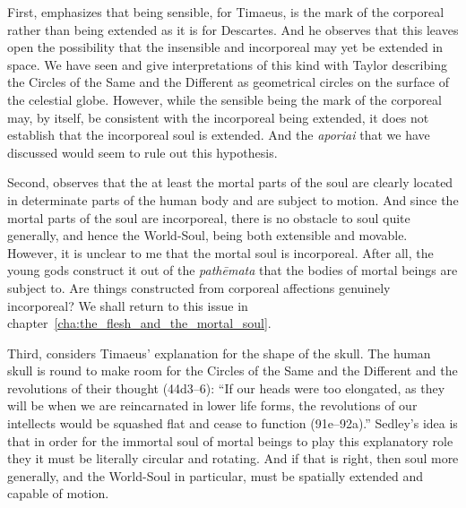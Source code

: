 First, \citet[329--30]{Sedley:1997kr} emphasizes that being sensible, for Timaeus, is the mark of the corporeal rather than being extended as it is for Descartes. And he observes that this leaves open the possibility that the insensible and incorporeal may yet be extended in space. We have seen \citet[111--2 n7]{Archer-Hind:1888qd} and \citet[148]{Taylor:1928qb} give interpretations of this kind with Taylor describing the Circles of the Same and the Different as geometrical circles on the surface of the celestial globe. However, while the sensible being the mark of the corporeal may, by itself, be consistent with the incorporeal being extended, it does not establish that the incorporeal soul is extended. And the \emph{aporiai} that we have discussed would seem to rule out this hypothesis.

Second, \citet[330]{Sedley:1997kr} observes that the at least the mortal parts of the soul are clearly located in determinate parts of the human body and are subject to motion. And since the mortal parts of the soul are incorporeal, there is no obstacle to soul quite generally, and hence the World-Soul, being both extensible and movable. However, it is unclear to me that the mortal soul is incorporeal. After all, the young gods construct it out of the \emph{pathēmata} that the bodies of mortal beings are subject to. Are things constructed from corporeal affections genuinely incorporeal? We shall return to this issue in chapter~\ref{cha:the_flesh_and_the_mortal_soul}.

Third, \citet[330]{Sedley:1997kr} considers Timaeus' explanation for the shape of the skull. The human skull is round to make room for the Circles of the Same and the Different and the revolutions of their thought (44d3--6): ``If our heads were too elongated, as they will be when we are reincarnated in lower life forms, the revolutions of our intellects would be squashed flat and cease to function (91e--92a).'' Sedley's idea is that in order for the immortal soul of mortal beings to play this explanatory role they it must be literally circular and rotating. And if that is right, then soul more generally, and the World-Soul in particular, must be spatially extended and capable of motion. 

